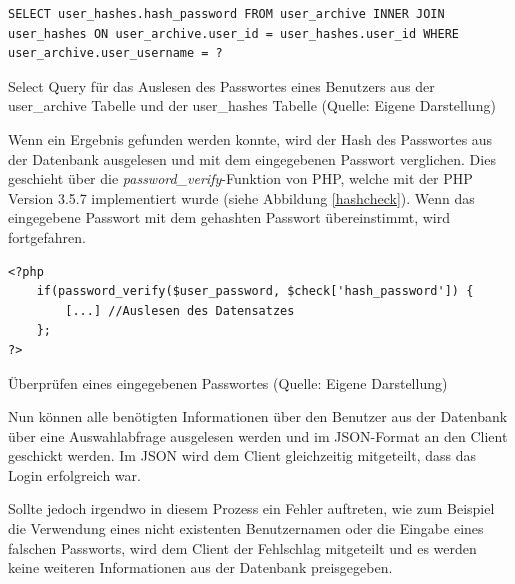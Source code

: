 \documentclass[../main.tex]{subfiles}
\begin{document}
	 \begin{code}
	 	\begin{center}
	 		\begin{verbatim}
SELECT user_hashes.hash_password FROM user_archive INNER JOIN user_hashes ON user_archive.user_id = user_hashes.user_id WHERE user_archive.user_username = ?
	 		\end{verbatim}
	 		\caption{Select Query für das Auslesen des Passwortes eines Benutzers aus der user\_archive Tabelle und der user\_hashes Tabelle (Quelle: Eigene Darstellung)}\label{SQL:SALT}
	 	\end{center}
	 \end{code}
 
 	Wenn ein Ergebnis gefunden werden konnte, wird der Hash des Passwortes aus der Datenbank ausgelesen und mit dem eingegebenen Passwort verglichen. Dies geschieht über die \emph{password\_verify}-Funktion von PHP, welche mit der PHP Version 3.5.7 implementiert wurde (siehe Abbildung \ref{hashcheck}). Wenn das eingegebene Passwort mit dem gehashten Passwort übereinstimmt, wird fortgefahren. 
 	
\begin{code}
 	\begin{center}
 		\begin{verbatim}
<?php
	if(password_verify($user_password, $check['hash_password']) {
		[...] //Auslesen des Datensatzes
	};
?>
 			\end{verbatim}
 			\caption{Überprüfen eines eingegebenen Passwortes (Quelle: Eigene Darstellung)}\label{hashcheck}
 		\end{center}
 	\end{code}
 	
 	Nun können alle benötigten Informationen über den Benutzer aus der Datenbank über eine Auswahlabfrage ausgelesen werden und im JSON-Format an den Client geschickt werden. Im JSON wird dem Client gleichzeitig mitgeteilt, dass das Login erfolgreich war.
	 
	Sollte jedoch irgendwo in diesem Prozess ein Fehler auftreten, wie zum Beispiel die Verwendung eines nicht existenten Benutzernamen oder die Eingabe eines falschen Passworts, wird dem Client der Fehlschlag mitgeteilt und es werden keine weiteren Informationen aus der Datenbank preisgegeben.
	
	 
\end{document}
